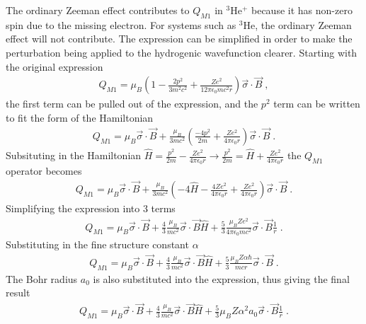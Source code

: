             The ordinary Zeeman effect contributes to $Q_{M1}$ in $^3$He$^+$ because it has non-zero spin due to the missing electron. For systems such as $^3$He, the ordinary Zeeman effect will not contribute. The expression can be simplified in order to make the perturbation being applied to the hydrogenic wavefunction clearer. Starting with the original expression 
            \begin{align}
                Q_{M1} = \mu_B\left( 1 - \frac{2p^2}{3m^2c^2} + \frac{Ze^2}{12\pi \epsilon_0 mc^2 r} \right) \vec{\sigma} \cdot \vec{B}\;,
            \end{align}
            \noindent the first term can be pulled out of the expression, and the $p^2$ term can be written to fit the form of the Hamiltonian 
            \begin{align}
                Q_{M1} = \mu_B \vec{\sigma} \cdot \vec{B} + \frac{\mu_B}{3mc^2} \left( \frac{-4p^2}{2m} + \frac{Ze^2}{4\pi \epsilon_0 r} \right) \vec{\sigma} \cdot \vec{B}\;.
            \end{align}
            \noindent Subsituting in the Hamiltonian $\hat{H} = \frac{p^2}{2m} - \frac{Ze^2}{4\pi \epsilon_0 r} \longrightarrow \frac{p^2}{2m} = \hat{H} + \frac{Ze^2}{4\pi \epsilon_0 r}$ the $Q_{M1}$ operator becomes 
            \begin{align}
                Q_{M1} = \mu_B \vec{\sigma} \cdot \vec{B} + \frac{\mu_B}{3mc^2} \left( -4\hat{H} - \frac{4Ze^2}{4\pi \epsilon_0 r} + \frac{Ze^2}{4\pi \epsilon_0 r} \right) \vec{\sigma} \cdot \vec{B}\;.
            \end{align}
            \noindent Simplifying the expression into 3 terms 
            \begin{align}
                Q_{M1} = \mu_B \vec{\sigma} \cdot \vec{B} + \frac{4}{3}\frac{\mu_B}{mc^2}\vec{\sigma} \cdot \vec{B} \hat{H} + \frac{5}{3}\frac{\mu_B Ze^2}{4\pi \epsilon_0 mc^2}\vec{\sigma} \cdot \vec{B} \frac{1}{r}\;.
            \end{align}
            \noindent Substituting in the fine structure constant $\alpha$ 
            \begin{align}
                Q_{M1} = \mu_B \vec{\sigma} \cdot \vec{B} + \frac{4}{3}\frac{\mu_B}{mc^2}\vec{\sigma} \cdot \vec{B} \hat{H} + \frac{5}{3}\frac{\mu_B Z \alpha \hbar}{mcr}\vec{\sigma} \cdot \vec{B} \;.
            \end{align}
            \noindent The Bohr radius $a_0$ is also substituted into the expression, thus giving the final result
            \begin{align}
                Q_{M1} = \mu_B \vec{\sigma} \cdot \vec{B} + \frac{4}{3}\frac{\mu_B}{mc^2}\vec{\sigma} \cdot \vec{B} \hat{H} + \frac{5}{3}\mu_B Z \alpha^2 a_0 \vec{\sigma} \cdot \vec{B} \frac{1}{r} \;.
            \end{align}
